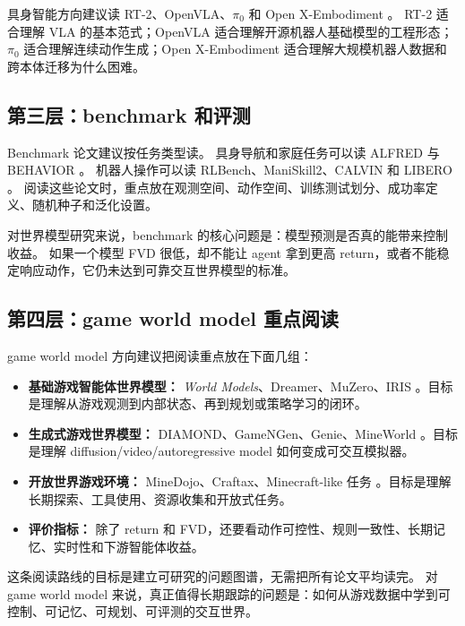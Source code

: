 \documentclass[11pt,a4paper]{ctexart}
\begin{document}
具身智能方向建议读 RT-2、OpenVLA、$\pi_0$ 和 Open X-Embodiment \cite{brohan2023rt2,kim2024openvla,black2024pi0,openx2023rtx}。
RT-2 适合理解 VLA 的基本范式；OpenVLA 适合理解开源机器人基础模型的工程形态；$\pi_0$ 适合理解连续动作生成；Open X-Embodiment 适合理解大规模机器人数据和跨本体迁移为什么困难。

\subsection{第三层：benchmark 和评测}

Benchmark 论文建议按任务类型读。
具身导航和家庭任务可以读 ALFRED 与 BEHAVIOR \cite{shridhar2020alfred,srivastava2021behavior}。
机器人操作可以读 RLBench、ManiSkill2、CALVIN 和 LIBERO \cite{james2020rlbench,gu2023maniskill2,mees2022calvin,liu2023libero}。
阅读这些论文时，重点放在观测空间、动作空间、训练测试划分、成功率定义、随机种子和泛化设置。

对世界模型研究来说，benchmark 的核心问题是：模型预测是否真的能带来控制收益。
如果一个模型 FVD 很低，却不能让 agent 拿到更高 return，或者不能稳定响应动作，它仍未达到可靠交互世界模型的标准。

\subsection{第四层：game world model 重点阅读}

game world model 方向建议把阅读重点放在下面几组：

\begin{itemize}
  \item \textbf{基础游戏智能体世界模型：} \emph{World Models}、Dreamer、MuZero、IRIS \cite{ha2018worldmodels,hafner2020dreamer,schrittwieser2020muzero,micheli2022iris}。目标是理解从游戏观测到内部状态、再到规划或策略学习的闭环。
  \item \textbf{生成式游戏世界模型：} DIAMOND、GameNGen、Genie、MineWorld \cite{alonso2024diamond,valevski2024gamengen,bruce2024genie,mineworld2025}。目标是理解 diffusion/video/autoregressive model 如何变成可交互模拟器。
  \item \textbf{开放世界游戏环境：} MineDojo、Craftax、Minecraft-like 任务 \cite{fan2022minedojo,matthews2024craftax}。目标是理解长期探索、工具使用、资源收集和开放式任务。
  \item \textbf{评价指标：} 除了 return 和 FVD，还要看动作可控性、规则一致性、长期记忆、实时性和下游智能体收益。
\end{itemize}

这条阅读路线的目标是建立可研究的问题图谱，无需把所有论文平均读完。
对 game world model 来说，真正值得长期跟踪的问题是：如何从游戏数据中学到可控制、可记忆、可规划、可评测的交互世界。
\end{document}

